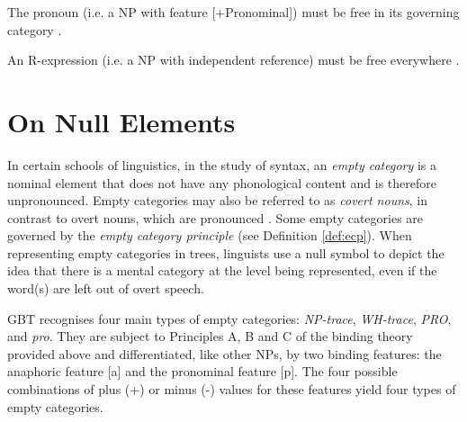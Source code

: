     \begin{generalization}\label{gen:binding-theory-b}
        The pronoun (i.e. a NP with feature [+Pronominal]) must be free in its governing category \citep[225]{Haegeman1991}.
    \end{generalization}
    
    \begin{generalization}\label{gen:binding-theory-c}
        An R-expression (i.e. a NP with independent reference) must be free everywhere \citep[227]{Haegeman1991}.
    \end{generalization}

\section{On Null Elements}
\label{sec:null-elements-gbt}

    In certain schools of linguistics, in the study of syntax, an \textit{empty category} is a nominal element that does not have any phonological content and is therefore unpronounced. Empty categories may also be referred to as \textit{covert nouns}, in contrast to overt nouns, which are pronounced \citep{Chomsky1993lectures}. Some empty categories are governed by the \textit{empty category principle} (see Definition \ref{def:ecp}). When representing empty categories in trees, linguists use a null symbol to depict the idea that there is a mental category at the level being represented, even if the word(s) are left out of overt speech. 

    GBT recognises four main types of empty categories: \textit{NP-trace}, \textit{WH-trace}, \textit{PRO}, and \textit{pro}. They are subject to Principles A, B and C of the binding theory provided above and differentiated, like other NPs, by two binding features: the anaphoric feature [a] and the pronominal feature [p]. The four possible combinations of plus (+) or minus (-) values for these features yield four types of empty categories. 

